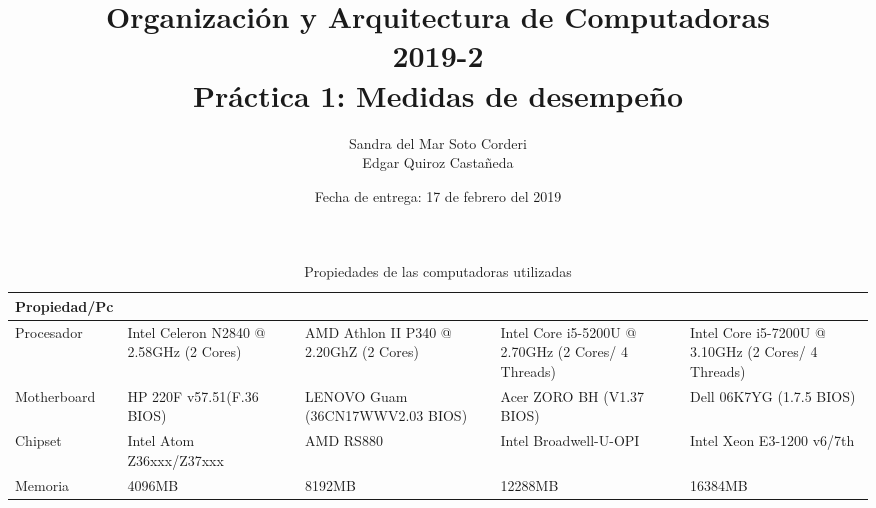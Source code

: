 \documentclass{article}
\begin{document}
    
    \title{Organización y Arquitectura de Computadoras\\
    \large 2019-2 \\
    \large Práctica 1: Medidas de desempeño}

    \date{Fecha de entrega: 17 de febrero del 2019}

    \author{Sandra del Mar Soto Corderi\\
    Edgar Quiroz Castañeda}

    \maketitle

    
\begin{table}
\caption*{Propiedades de las computadoras utilizadas}
\begin{tabularx}{\linewidth}{|L|L|L|L|L|}
\hline
Propiedad/Pc                                   &  &      &                 &  \\ \hline
{}Procesador             & Intel Celeron N2840 @ 2.58GHz (2 Cores)                & AMD Athlon II P340 @ 2.20GhZ (2 Cores)                      & Intel Core i5-5200U @ 2.70GHz (2 Cores/ 4 Threads)                     & Intel Core i5-7200U @ 3.10GHz (2 Cores/ 4 Threads)       \\ \hline
{}Motherboard            & HP 220F v57.51(F.36 BIOS)                              & LENOVO Guam (36CN17WWV2.03 BIOS)                            & Acer ZORO BH (V1.37 BIOS)                                              & Dell 06K7YG (1.7.5 BIOS)                                 \\ \hline
{}Chipset                & Intel Atom Z36xxx/Z37xxx                               & AMD RS880                                                   & Intel Broadwell-U-OPI                                                  & Intel Xeon E3-1200 v6/7th                                \\ \hline
{}Memoria                & 4096MB                                                 & 8192MB                                                      & 12288MB                                                                & 16384MB                                                  \\ \hline

\end{tabularx}
\end{table}
\end{document}
